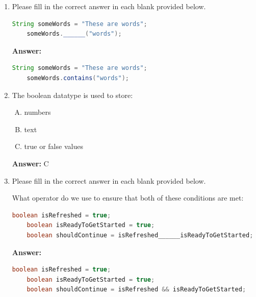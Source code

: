 \documentclass[12pt]{article}
\begin{document}
\begin{enumerate}[1.]
    \item

    Please fill in the correct answer in each blank provided below.

    \bigskip

    \begin{lstlisting}[language=Java]
    String someWords = "These are words";
    someWords.______("words");
    \end{lstlisting}

    \bigskip

    \textbf{Answer:}

    \bigskip

    \begin{lstlisting}[language=Java]
    String someWords = "These are words";
    someWords.contains("words");
    \end{lstlisting}

    \item

    The boolean datatype is used to store:

    \bigskip

    \begin{enumerate}[A.]
        \item numbers
        \item text
        \item true or false values
    \end{enumerate}

    \bigskip

    \textbf{Answer:} C

    \item Please fill in the correct answer in each blank provided below.

    \bigskip

    What operator do we use to ensure that both of these conditions are met:

    \begin{lstlisting}[language=Java]
    boolean isRefreshed = true;
    boolean isReadyToGetStarted = true;
    boolean shouldContinue = isRefreshed______isReadyToGetStarted;
    \end{lstlisting}

    \bigskip

    \textbf{Answer:}

    \bigskip

    \begin{lstlisting}[language=Java]
    boolean isRefreshed = true;
    boolean isReadyToGetStarted = true;
    boolean shouldContinue = isRefreshed && isReadyToGetStarted;
    \end{lstlisting}



\end{enumerate}
\end{document}

